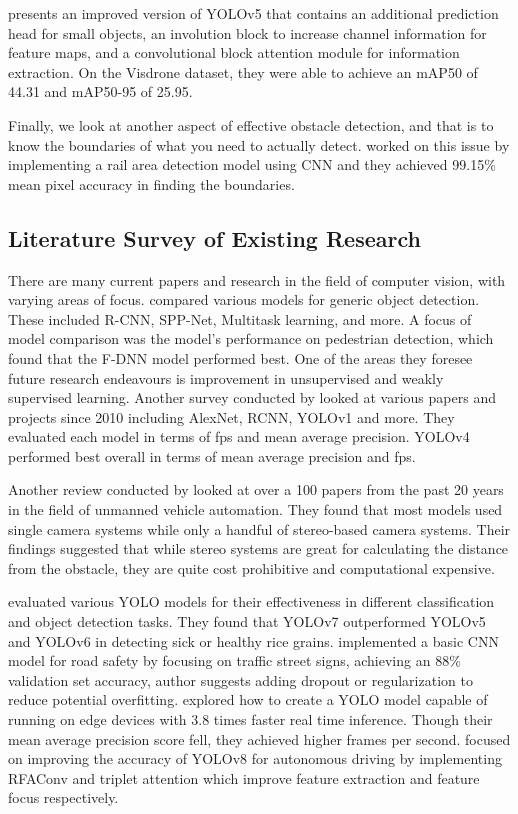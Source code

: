\documentclass[stu,12pt,floatsintext]{apa7}
\begin{document}
\textcite{tangHicYolo} presents an improved version of YOLOv5 that contains an additional prediction head for small objects, an involution block to increase channel information for feature maps, and a convolutional block attention module for information extraction. On the Visdrone dataset, they were able to achieve an mAP50 of 44.31 and mAP50-95 of 25.95. 

Finally, we look at another aspect of effective obstacle detection, and that is to know the boundaries of what you need to actually detect. \textcite{wang_efficient_2018} worked on this issue by implementing a rail area detection model using CNN and they achieved 99.15\% mean pixel accuracy in finding the boundaries.

\subsection{Literature Survey of Existing Research}
There are many current papers and research in the field of computer vision, with varying areas of focus. \textcite{zhao_object_2019} compared various models for generic object detection. These included R-CNN, SPP-Net, Multitask learning, and more. A focus of model comparison was the model's performance on pedestrian detection, which found that the F-DNN model \parencite{du_fused_2017} performed best.
One of the areas they foresee future research endeavours is improvement in unsupervised and weakly supervised learning. Another survey conducted by \textcite{turay_toward_2022} looked at various papers and projects since 2010 including AlexNet, RCNN, YOLOv1 and more. They evaluated each model in terms of fps and mean average precision. YOLOv4 performed best overall in terms of mean average precision and fps.

Another review conducted by \textcite{badrloo_image-based_2022} looked at over a 100 papers from the past 20 years in the field of unmanned vehicle automation. They found that most models used single camera systems while only a handful of stereo-based camera systems. Their findings suggested that while stereo systems are great for calculating the distance from the obstacle, they are quite cost prohibitive and computational expensive.

\textcite{quach_evaluating_2023} evaluated various YOLO models for their effectiveness in different classification and object detection tasks. They found that YOLOv7 outperformed YOLOv5 and YOLOv6 in detecting sick or healthy rice grains. \textcite{hindarto_enhancing_2023} implemented a basic CNN model for road safety by focusing on traffic street signs, achieving an 88\% validation set accuracy, author suggests adding dropout or regularization to reduce potential overfitting. \textcite{pedoeem_yolo-lite_2018} explored how to create a YOLO model capable of running on edge devices with 3.8 times faster real time inference. Though their mean average precision score fell, they achieved higher frames per second. \textcite{ling_optimization_2024} focused on improving the accuracy of YOLOv8 for autonomous driving by implementing RFAConv and triplet attention which improve feature extraction and feature focus respectively.
\end{document}

